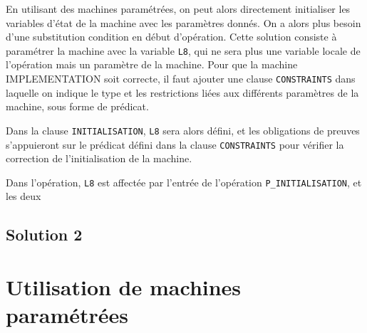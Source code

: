 \documentclass{cercles2}
\begin{document}
En utilisant des machines paramétrées, on peut alors directement
initialiser les variables d'état de la  machine avec les paramètres
donnés. On a alors plus besoin d'une substitution \textsf{condition}
en début d'opération. 
Cette solution consiste à paramétrer la machine avec la variable
\texttt{L8}, qui ne sera plus une variable locale de l'opération mais
un paramètre de la machine. 
Pour que la machine IMPLEMENTATION soit correcte, il faut ajouter une
clause \texttt{CONSTRAINTS} dans laquelle on indique le type et les
restrictions liées aux différents paramètres de la machine, sous forme
de prédicat.

Dans la clause \texttt{INITIALISATION}, \texttt{L8} sera alors défini,
et les obligations de preuves s'appuieront sur le prédicat défini dans
la clause \texttt{CONSTRAINTS} pour vérifier la correction de
l'initialisation de la machine.

Dans l'opération, \texttt{L8} est affectée par l'entrée de l'opération
\texttt{P\_INITIALISATION}, et les deux


\subsection{Solution 2}




\section{Utilisation de machines paramétrées}
\end{document}
